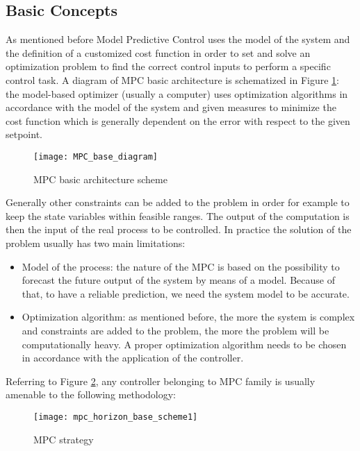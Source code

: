 \subsection{Basic Concepts}
As mentioned before Model Predictive Control uses the model of the system and the definition of a customized cost function in order to set and solve an optimization problem to find the correct control inputs to perform a specific control task.
A diagram of MPC basic architecture is schematized in Figure \ref{mpc_base_diagram}: the model-based optimizer (usually a computer) uses optimization algorithms in accordance with the model of the system and given measures to minimize the cost function which is generally dependent on the error with respect to the given setpoint.
\begin{figure}[h!]
	\centering
	\texttt{[image: MPC\_base\_diagram]}
	\caption{MPC basic architecture scheme}
	\label{mpc_base_diagram}
\end{figure}
Generally other constraints can be added to the problem in order for example to keep the state variables within feasible ranges. The output of the computation is then the input of the real process to be controlled. In  practice the solution of the problem usually has two main limitations:

\begin{itemize}
\item Model of the process: the nature of the MPC is based on the possibility to forecast the future output of the system by means of a model. Because of that, to have a reliable prediction, we need the system model to be accurate.

\item Optimization algorithm: as mentioned before, the more the system is complex and constraints are added to the problem, the more the problem will be computationally heavy. A proper optimization algorithm needs to be chosen in accordance with the application of the controller.
  
\end{itemize}
Referring to Figure \ref{mpc_horizon_base_scheme}, any controller belonging to MPC family is usually amenable to the following methodology:
\begin{figure}[h!]
	\centering
	\texttt{[image: mpc\_horizon\_base\_scheme1]}
	\caption{MPC strategy}
	\label{mpc_horizon_base_scheme}
\end{figure}

